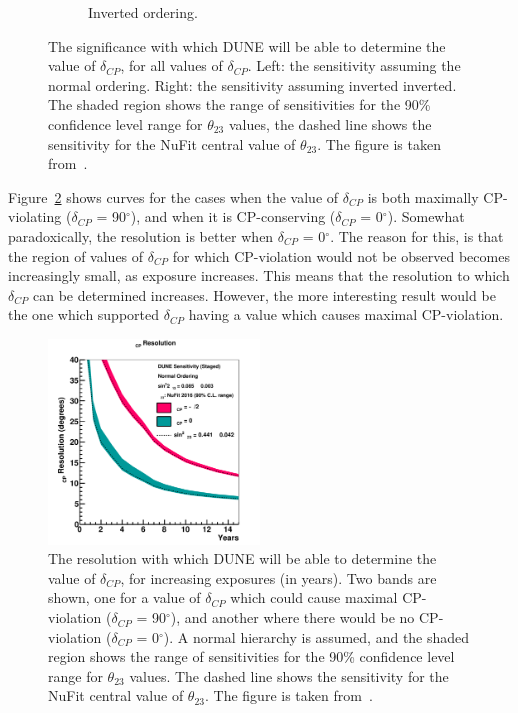 \begin{figure}
\begin{subfigure}{0.49\textwidth}
    \caption{Inverted ordering.}
  \end{subfigure}
  \caption[The significance with which DUNE will be able to determine the value of $\delta_{CP}$, for all values of $\delta_{CP}$]
          {The significance with which DUNE will be able to determine the value of $\delta_{CP}$, for all values of $\delta_{CP}$. Left: the sensitivity assuming the normal ordering. Right: the sensitivity assuming inverted inverted. The shaded region shows the range of sensitivities for the 90\% confidence level range for $\theta_{23}$ values, the dashed line shows the sensitivity for the NuFit central value of $\theta_{23}$. The figure is taken from~\citep{DUNE2332}.}
  \label{fig:DUNECPViolation}
\end{figure}

Figure~\ref{fig:DUNECPViolationRes} shows curves for the cases when the value of $\delta_{CP}$ is both maximally CP-violating ($\delta_{CP}$ = 90$^{\circ}$), and when it is CP-conserving ($\delta_{CP}$ = 0$^{\circ}$). Somewhat paradoxically, the resolution is better when $\delta_{CP}$ = 0$^{\circ}$. The reason for this, is that the region of values of $\delta_{CP}$ for which CP-violation would not be observed becomes increasingly small, as exposure increases. This means that the resolution to which $\delta_{CP}$ can be determined increases. However, the more interesting result would be the one which supported $\delta_{CP}$ having a value which causes maximal CP-violation. \\

\begin{figure}
  \centering
  \includegraphics[width=0.5\textwidth]{resdcp_exp_staging_th23band_2017}
  \caption[The resolution with which DUNE will be able to determine the value of $\delta_{CP}$, for increasing exposures]
          {The resolution with which DUNE will be able to determine the value of $\delta_{CP}$, for increasing exposures (in years). Two bands are shown, one for a value of $\delta_{CP}$ which could cause maximal CP-violation ($\delta_{CP}$ = 90$^{\circ}$), and another where there would be no CP-violation ($\delta_{CP}$ = 0$^{\circ}$). A normal hierarchy is assumed, and the shaded region shows the range of sensitivities for the 90\% confidence level range for $\theta_{23}$ values. The dashed line shows the sensitivity for the NuFit central value of $\theta_{23}$. The figure is taken from~\citep{DUNE2377}.}
  \label{fig:DUNECPViolationRes}
\end{figure}

